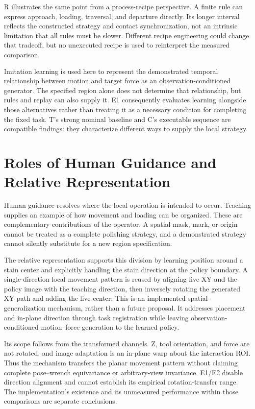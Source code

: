 R illustrates the same point from a process-recipe perspective. A finite rule can express approach, loading, traversal, and departure directly. Its longer interval reflects the constructed strategy and contact synchronization, not an intrinsic limitation that all rules must be slower. Different recipe engineering could change that tradeoff, but no unexecuted recipe is used to reinterpret the measured comparison.

Imitation learning is used here to represent the demonstrated temporal relationship between motion and target force as an observation-conditioned generator. The specified region alone does not determine that relationship, but rules and replay can also supply it. E1 consequently evaluates learning alongside those alternatives rather than treating it as a necessary condition for completing the fixed task. T's strong nominal baseline and C's executable sequence are compatible findings: they characterize different ways to supply the local strategy.

\section{Roles of Human Guidance and Relative Representation}
Human guidance resolves where the local operation is intended to occur. Teaching supplies an example of how movement and loading can be organized. These are complementary contributions of the operator. A spatial mask, mark, or origin cannot be treated as a complete polishing strategy, and a demonstrated strategy cannot silently substitute for a new region specification.

The relative representation supports this division by learning position around a stain center and explicitly handling the stain direction at the policy boundary. A single-direction local movement pattern is reused by aligning live XY and the policy image with the teaching direction, then inversely rotating the generated XY path and adding the live center. This is an implemented spatial-generalization mechanism, rather than a future proposal. It addresses placement and in-plane direction through task registration while leaving observation-conditioned motion--force generation to the learned policy.

Its scope follows from the transformed channels. Z, tool orientation, and force are not rotated, and image adaptation is an in-plane warp about the interaction ROI. Thus the mechanism transfers the planar movement pattern without claiming complete pose--wrench equivariance or arbitrary-view invariance. E1/E2 disable direction alignment and cannot establish its empirical rotation-transfer range. The implementation's existence and its unmeasured performance within those comparisons are separate conclusions.

